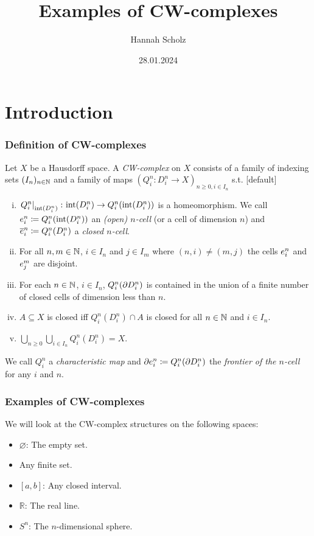 \documentclass{beamer}
\title{Examples of CW-complexes}
\author{Hannah Scholz}
\institute[MI]{Mathematical Institute of the University of Bonn}
\date{28.01.2024}
\begin{document}
\frame{\titlepage}

\section{Introduction}

\begin{frame}
\frametitle{Definition of CW-complexes}
\fontsize{10pt}{5}\selectfont
  Let $X$ be a Hausdorff space.
    A \emph{CW-complex} on $X$ consists of a family of indexing sets $(I_n)_{n \in \bN}$ and a family of maps $(Q_i^n\colon D_i^n\rightarrow X)_{n \ge 0, i \in I_n}$ s.t.
    [default]
    \begin{enumerate}[(i)]
        \item $\restrict{Q_i^n}{\interior{D_i^n}}\colon \interior{D_i^n} \rightarrow Q_i^n(\interior{D_i^n})$ is a homeomorphism. We call $\openCell{n}{i} \coloneq Q_i^n(\interior{D_i^n})$ an \emph{(open) $n$-cell} (or a cell of dimension $n$)
        and $\closedCell{n}{i} \coloneq Q_i^n(D_i^n)$ a \emph{closed $n$-cell}.
        \item For all $n, m \in \bN$, $i \in I_n$ and $j \in I_m$ where $(n, i) \ne (m, j)$ the cells $\openCell{n}{i}$ and $\openCell{m}{j}$ are disjoint.
        \item For each $n \in \bN$, $i \in I_n$, $Q_i^n(\boundary D_i^n)$ is contained in the union of a finite number of closed cells of dimension less than $n$.
        \item $A \subseteq X$ is closed iff $Q_i^n(D_i^n) \cap A$ is closed for all $n \in \bN$ and $i \in I_n$.
        \item $\bigcup_{n \ge 0}\bigcup_{i \in I_n} Q_i^n(D_i^n) = X$.
    \end{enumerate}
    We call $Q_i^n$ a \emph{characteristic map} and $\cellFrontier{n}{i} \coloneq Q_i^n(\boundary D_i^n)$ the \emph{frontier of the $n$-cell} for any $i$ and $n$.
\end{frame}

\begin{frame}
  \frametitle{Examples of CW-complexes}
  We will look at the CW-complex structures on the following spaces: 
  \begin{itemize}
    \item $\varnothing$: The empty set. 
    \item Any finite set. 
    \item $[a, b]$: Any closed interval.
    \item $\mathbb{R}$: The real line. 
    \item $S^n$: The $n$-dimensional sphere.
  \end{itemize}
\end{frame}
\end{document}
